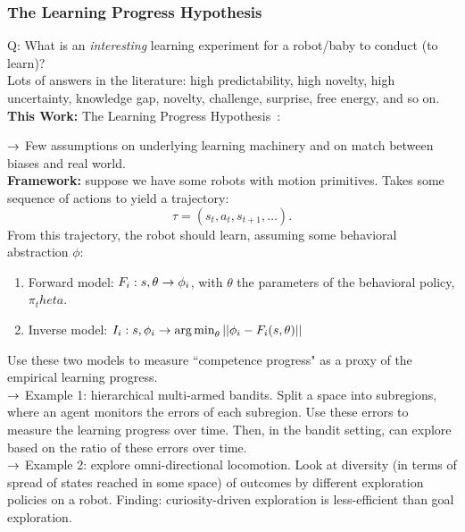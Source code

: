 \subsubsection{The Learning Progress Hypothesis}

Q: What is an {\it interesting} learning experiment for a robot/baby to conduct (to learn)? \\

Lots of answers in the literature: high predictability, high novelty, high uncertainty, knowledge gap, novelty, challenge, surprise, free energy, and so on. \\

{\bf This Work:} The Learning Progress Hypothesis~\cite{oudeyer2016intrinsic}:


$\rightarrow$ Few assumptions on underlying learning machinery and on match between biases and real world. \\


{\bf Framework:} suppose we have some robots with motion primitives. Takes some sequence of actions to yield a trajectory:
\[
\tau = (s_t, a_t, s_{t+1}, \ldots).
\]
From this trajectory, the robot should learn, assuming some behavioral abstraction $\phi$:
\begin{enumerate}
    \item Forward model: $F_i : s, \theta \rightarrow \phi_i$, with $\theta$ the parameters of the behavioral policy, $\pi_theta$.
    \item Inverse model: $I_i : s, \phi_i \rightarrow \operatorname*{arg\,min}_\theta ||\phi_i - F_i(s,\theta)||$
\end{enumerate}

Use these two models to measure ``competence progress" as a proxy of the empirical learning progress. \\

$\rightarrow$ Example 1: hierarchical multi-armed bandits. Split a space into subregions, where an agent monitors the errors of each subregion. Use these errors to measure the learning progress over time. Then, in the bandit setting, can explore based on the ratio of these errors over time. \\

$\rightarrow$ Example 2: explore omni-directional locomotion. Look at diversity (in terms of spread of states reached in some space) of outcomes by different exploration policies on a robot. Finding: curiosity-driven exploration is less-efficient than goal exploration.\\

